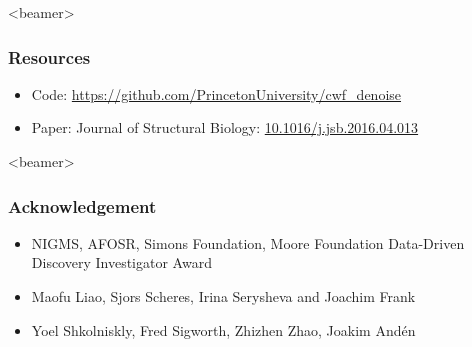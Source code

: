 \documentclass{beamer}
\begin{document}
\begin{frame}<beamer>
\frametitle{Resources}
\begin{itemize}
 \item Code: \url{https://github.com/PrincetonUniversity/cwf_denoise}
 \item Paper: Journal of Structural Biology: \url{10.1016/j.jsb.2016.04.013}
\end{itemize}
\end{frame}


\begin{frame}<beamer>
\frametitle{Acknowledgement}
\begin{itemize}
 \item  NIGMS, AFOSR, Simons
Foundation, Moore Foundation Data-Driven Discovery Investigator Award
\item  Maofu Liao, Sjors Scheres, Irina Serysheva and Joachim Frank
\item Yoel Shkolniskly, Fred Sigworth, Zhizhen Zhao, Joakim And\'en
\end{itemize}
\end{frame}
\end{document}

